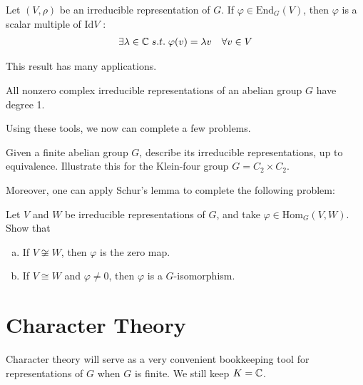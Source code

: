 \documentclass{memoir}
\begin{document}
\begin{lemma}
	Let \((V,\rho)\) be an irreducible representation of \(G\). If \(\varphi \in \textrm{End}_G(V)\), then \(\varphi\) is a scalar multiple of \(\textrm{Id}V\) :
	\begin{align*}
		\exists \lambda \in \mathbb{C} \; s.t. \; \varphi(v) = \lambda v \quad \forall v \in V
	\end{align*}
\end{lemma}
This result has many applications.
\begin{thm}
	All nonzero complex irreducible representations of an abelian group \(G\) have degree 1.
\end{thm}
Using these tools, we now can complete a few problems.

\begin{hw}
	Given a finite abelian group \(G\), describe its irreducible representations, up to equivalence. Illustrate this for the Klein-four group \(G = C_2\times C_2\).
\end{hw}
Moreover, one can apply Schur's lemma to complete the following problem:
\begin{hw}
	Let \(V\) and \(W\) be irreducible representations of \(G\), and take \(\varphi \in \textrm{Hom}_G(V,W)\). Show that
	\begin{enumerate}[(a).]
		\item If \(V \not\cong W\), then \(\varphi\) is the zero map.
		\item If \(V \cong W\) and \(\varphi\neq 0\), then \(\varphi\) is a \(G\)-isomorphism.
	\end{enumerate}
\end{hw} %


\section{Character Theory}
\label{sec:character_theory}

Character theory will serve as a very convenient bookkeeping tool for representations of \(G\) when \(G\) is finite. We still keep \(K = \mathbb{C}\).
\end{document}
